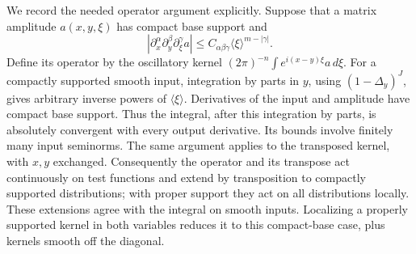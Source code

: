 \documentclass[
  11pt,
]{article}
\begin{document}
We record the needed operator argument explicitly. Suppose that a matrix
amplitude \(a(x,y,\xi)\) has compact base support and \[
 |\partial_x^\alpha\partial_y^\beta\partial_\xi^\gamma a|
                   \leq C_{\alpha\beta\gamma}\langle\xi\rangle^{m-|\gamma|}.
                                                               \tag{HW1}
\] Define its operator by the oscillatory kernel
\((2\pi)^{-n}\int e^{i(x-y)\xi}a\,d\xi\). For a compactly supported
smooth input, integration by parts in \(y\), using \((1-\Delta_y)^J\),
gives arbitrary inverse powers of \(\langle\xi\rangle\). Derivatives of
the input and amplitude have compact base support. Thus the integral,
after this integration by parts, is absolutely convergent with every
output derivative. Its bounds involve finitely many input seminorms. The
same argument applies to the transposed kernel, with \(x,y\) exchanged.
Consequently the operator and its transpose act continuously on test
functions and extend by transposition to compactly supported
distributions; with proper support they act on all distributions
locally. These extensions agree with the integral on smooth inputs.
Localizing a properly supported kernel in both variables reduces it to
this compact-base case, plus kernels smooth off the diagonal.
\end{document}
